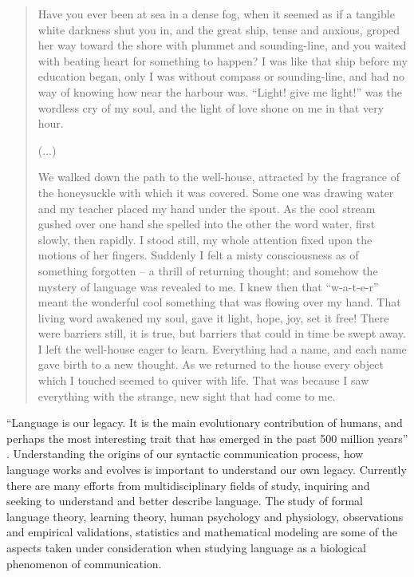 \begin{quote}
Have you ever been at sea in a dense fog, when it seemed as if a tangible white darkness shut you in, 
and the great ship, tense and anxious, groped her way toward the shore with plummet and sounding-line, 
and you waited with beating heart for something to happen? I was like that ship before my education began, 
only I was without compass or sounding-line, and had no way of knowing how near the harbour was. 
``Light! give me light!'' was the wordless cry of my soul, and the light of love shone on me in that very hour.

(...)

We walked down the path to the well-house, attracted by the fragrance of the honeysuckle with which it was covered. 
Some one was drawing water and my teacher placed my hand under the spout. As the cool stream gushed over one hand 
she spelled into the other the word water, first slowly, then rapidly. I stood still, my whole attention fixed upon 
the motions of her fingers. Suddenly I felt a misty consciousness as of something forgotten -- a thrill of returning 
thought; and somehow the mystery of language was revealed to me. I knew then that ``w-a-t-e-r'' meant the wonderful 
cool something that was flowing over my hand. That living word awakened my soul, gave it light, hope, joy, set it free! 
There were barriers still, it is true, but barriers that could in time be swept away.
I left the well-house eager to learn. Everything had a name, and each name gave birth to a new thought. 
As we returned to the house every object which I touched seemed to quiver with life. 
That was because I saw everything with the strange, new sight that had come to me.
\end{quote}

``Language is our legacy. It is the main evolutionary contribution of humans, and perhaps the most 
interesting trait that has emerged in the past 500 million years'' \citep{nowak2002}. Understanding the origins 
of our syntactic communication process, how language works and evolves is important to understand
our own legacy. Currently there are many efforts from multidisciplinary fields of study, inquiring
and seeking to understand and better describe language. The study of formal language theory, learning
theory, human psychology and physiology, observations and empirical validations, statistics and
mathematical modeling are some of the aspects taken under consideration when studying 
language as a biological phenomenon of communication.

